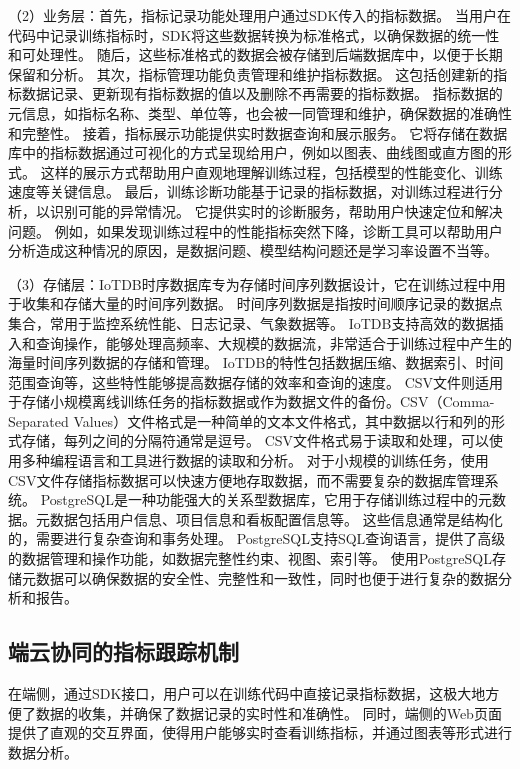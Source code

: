 （2）业务层：首先，指标记录功能处理用户通过SDK传入的指标数据。
当用户在代码中记录训练指标时，SDK将这些数据转换为标准格式，以确保数据的统一性和可处理性。
随后，这些标准格式的数据会被存储到后端数据库中，以便于长期保留和分析。
其次，指标管理功能负责管理和维护指标数据。
这包括创建新的指标数据记录、更新现有指标数据的值以及删除不再需要的指标数据。
指标数据的元信息，如指标名称、类型、单位等，也会被一同管理和维护，确保数据的准确性和完整性。
接着，指标展示功能提供实时数据查询和展示服务。
它将存储在数据库中的指标数据通过可视化的方式呈现给用户，例如以图表、曲线图或直方图的形式。
这样的展示方式帮助用户直观地理解训练过程，包括模型的性能变化、训练速度等关键信息。
最后，训练诊断功能基于记录的指标数据，对训练过程进行分析，以识别可能的异常情况。
它提供实时的诊断服务，帮助用户快速定位和解决问题。
例如，如果发现训练过程中的性能指标突然下降，诊断工具可以帮助用户分析造成这种情况的原因，是数据问题、模型结构问题还是学习率设置不当等。

（3）存储层：IoTDB时序数据库\cite{Wan23}专为存储时间序列数据设计，它在训练过程中用于收集和存储大量的时间序列数据。
时间序列数据是指按时间顺序记录的数据点集合，常用于监控系统性能、日志记录、气象数据等。
IoTDB支持高效的数据插入和查询操作，能够处理高频率、大规模的数据流，非常适合于训练过程中产生的海量时间序列数据的存储和管理。
IoTDB的特性包括数据压缩、数据索引、时间范围查询等，这些特性能够提高数据存储的效率和查询的速度。
CSV文件则适用于存储小规模离线训练任务的指标数据或作为数据文件的备份。CSV（Comma-Separated Values）文件格式是一种简单的文本文件格式，其中数据以行和列的形式存储，每列之间的分隔符通常是逗号。
CSV文件格式易于读取和处理，可以使用多种编程语言和工具进行数据的读取和分析。
对于小规模的训练任务，使用CSV文件存储指标数据可以快速方便地存取数据，而不需要复杂的数据库管理系统。
PostgreSQL是一种功能强大的关系型数据库，它用于存储训练过程中的元数据。元数据包括用户信息、项目信息和看板配置信息等。
这些信息通常是结构化的，需要进行复杂查询和事务处理。
PostgreSQL支持SQL查询语言，提供了高级的数据管理和操作功能，如数据完整性约束、视图、索引等。
使用PostgreSQL存储元数据可以确保数据的安全性、完整性和一致性，同时也便于进行复杂的数据分析和报告。

\subsection{端云协同的指标跟踪机制}

在端侧，通过SDK接口，用户可以在训练代码中直接记录指标数据，这极大地方便了数据的收集，并确保了数据记录的实时性和准确性。
同时，端侧的Web页面提供了直观的交互界面，使得用户能够实时查看训练指标，并通过图表等形式进行数据分析。

